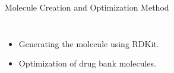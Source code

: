 \documentclass[aspectratio=169]{beamer}
\begin{document}
\begin{frame}{Molecule Creation and Optimization Method}
    \begin{columns}
            \begin{itemize}
            \item Generating the molecule using RDKit.
            \item Optimization of drug bank molecules.
      \end{itemize}
    \end{columns}
\end{frame}
\end{document}
